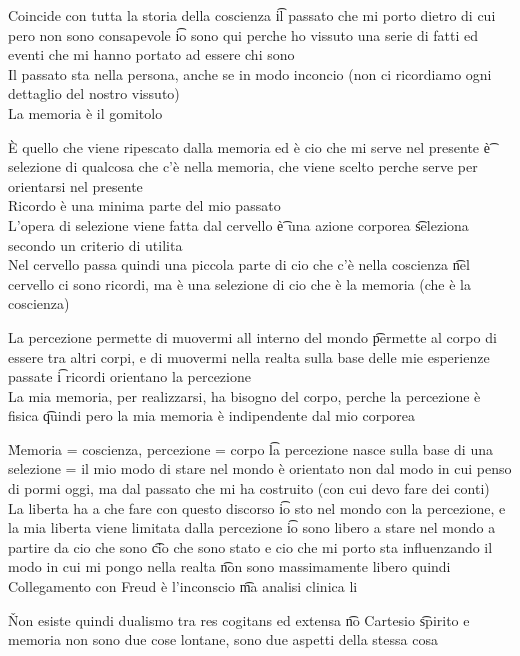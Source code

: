 \documentclass[12pt]{article}
\begin{document}
\sss[Memoria]
Coincide con tutta la storia della coscienza \t il passato che mi porto dietro di cui pero non sono consapevole \t io sono qui perche ho vissuto una serie di fatti ed eventi che mi hanno portato ad essere chi sono \\
Il passato sta nella persona, anche se in modo inconcio (non ci ricordiamo ogni dettaglio del nostro vissuto) \\
La memoria è il gomitolo

\sss[Ricordo]
È quello che viene ripescato dalla memoria ed è cio che mi serve nel presente \t è selezione di qualcosa che c'è nella memoria, che viene scelto perche serve per orientarsi nel presente \\
Ricordo è una minima parte del mio passato \\
L'opera di selezione viene fatta dal cervello \t è una azione corporea \t seleziona secondo un criterio di utilita \\
Nel cervello passa quindi una piccola parte di cio che c'è nella coscienza \t nel cervello ci sono ricordi, ma è una selezione di cio che è la memoria (che è la coscienza)

\sss[Percezione]
La percezione permette di muovermi all interno del mondo \t permette al corpo di essere tra altri corpi, e di muovermi nella realta sulla base delle mie esperienze passate \t i ricordi orientano la percezione \\
La mia memoria, per realizzarsi, ha bisogno del corpo, perche la percezione è fisica \t quindi pero la mia memoria è indipendente dal mio corporea

\v

Memoria = coscienza, percezione = corpo \t la percezione nasce sulla base di una selezione = il mio modo di stare nel mondo è orientato non dal modo in cui penso di pormi oggi, ma dal passato che mi ha costruito (con cui devo fare dei conti) \\
La liberta ha a che fare con questo discorso \t io sto nel mondo con la percezione, e la mia liberta viene limitata dalla percezione \t io sono libero a stare nel mondo a partire da cio che sono \t cio che sono stato e cio che mi porto sta influenzando il modo in cui mi pongo nella realta \t non sono massimamente libero quindi \\
Collegamento con Freud è l'inconscio \t ma analisi clinica li 

\v

Non esiste quindi dualismo tra res cogitans ed extensa \t no Cartesio \t spirito e memoria non sono due cose lontane, sono due aspetti della stessa cosa
\end{document}
